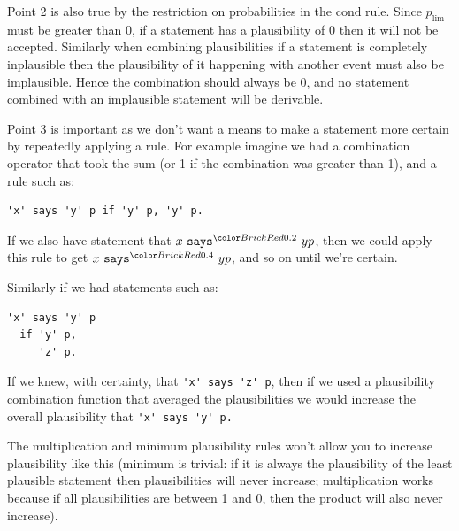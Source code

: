 \documentclass[thesis.tex]{subfiles}
\begin{document}
Point 2 is also true by the restriction on probabilities in the cond
rule.  Since $p_{\text{lim}}$ must be greater than 0, if a statement
has a plausibility of 0 then it will not be accepted.  Similarly when
combining plausibilities if a statement is completely inplausible then
the plausibility of it happening with another event must also be
implausible.  Hence the combination should always be 0, and no
statement combined with an implausible statement will be derivable.

Point 3 is important as we don't want a means to make a statement more
certain by repeatedly applying a rule.  For example imagine we had a
combination operator that took the sum (or 1 if the combination was
greater than 1), and a rule such as:

\begin{lstlisting} 
'x' says 'y' p if 'y' p, 'y' p.
\end{lstlisting}

If we also have statement that $x \says{0.2} y p$,
then we could apply this rule to get $x \says{0.4} y p$, and so on
until we're certain.

Similarly if we had statements  such as:
\begin{lstlisting} 
'x' says 'y' p 
  if 'y' p,
     'z' p.
\end{lstlisting}

If we knew, with certainty, that \lstinline!'x' says 'z' p!, then if
we used a plausibility combination function that averaged the
plausibilities we would increase the overall plausibility that
\lstinline!'x' says 'y' p.!

The multiplication and minimum plausibility rules won't allow you to
increase plausibility like this (minimum is trivial: if it is always
the plausibility of the least plausible statement then plausibilities
will never increase; multiplication works because if all
plausibilities are between 1 and 0, then the product will also never
increase).
\end{document}
